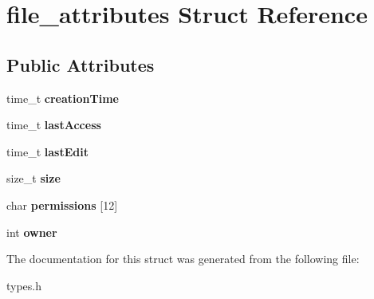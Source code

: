\hypertarget{structfile__attributes}{}\section{file\+\_\+attributes Struct Reference}
\label{structfile__attributes}
\subsection*{Public Attributes}
\begin{DoxyCompactItemize}
\item 
\mbox{\label{structfile__attributes_a9fa92e6a7d6ac7f18df7940697524411}} 
time\+\_\+t {\bfseries creation\+Time}
\item 
\mbox{\label{structfile__attributes_a9b16144fd6ce8d982afc738058f07fa3}} 
time\+\_\+t {\bfseries last\+Access}
\item 
\mbox{\label{structfile__attributes_ad4592775c8cb9a899a12ca551329a936}} 
time\+\_\+t {\bfseries last\+Edit}
\item 
\mbox{\label{structfile__attributes_a753691702c194d2e43c0fb62e6cd4ee1}} 
size\+\_\+t {\bfseries size}
\item 
\mbox{\label{structfile__attributes_a6af710c43bfc31b1a005c9ad7251f801}} 
char {\bfseries permissions} \mbox{[}12\mbox{]}
\item 
\mbox{\label{structfile__attributes_a74be4a864fa3f38eff632b4b25654b97}} 
int {\bfseries owner}
\end{DoxyCompactItemize}


The documentation for this struct was generated from the following file\+:\begin{DoxyCompactItemize}
\item 
types.\+h\end{DoxyCompactItemize}
